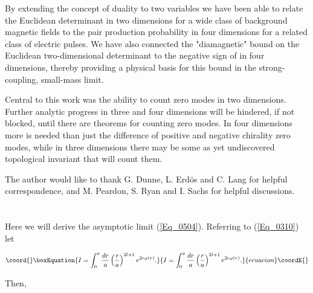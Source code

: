 \documentclass[a4paper,twocolumn,showpacs,preprintnumbers,amsmath,amssymb]{revtex4}
\begin{document}
By extending the concept of duality to two variables we have been able
to relate the Euclidean determinant in two dimensions for a wide class
of background magnetic fields to the pair production probability in
four dimensions for a related class of electric pulses. We have also
connected the "diamagnetic" bound on the Euclidean two-dimensional
determinant to the negative sign of
\coordHE{} in four dimensions, thereby
providing a physical basis for this bound in the strong-coupling,
small-mass limit.

Central to this work was the ability to count zero modes in two
dimensions. Further analytic progress in three and four dimensions
will be hindered, if not blocked, until there are theorems for
counting zero modes. In four dimensions more is needed than just the
difference of positive and negative chirality zero modes, while in
three dimensions there may be some as yet undiscovered topological
invariant that will count them.


\begin{acknowledgments}
The author would like to thank G. Dunne, L. Erd\"{o}s and C. Lang for
helpful correspondence, and M. Peardon, S. Ryan and I. Sachs for
helpful discussions.
\end{acknowledgments}

\appendix*

\section{}

\setcounter{equation}{0}
\renewcommand{\theequation}{A\arabic{equation}}


Here we will derive the asymptotic limit (\ref{Eq_0504}). Referring to
(\ref{Eq_0310}) let

\begin{equation}\coord{}\boxEquation{
\label{Eq_A01}
I = \int^a_0 \frac{dr}{a}
  \left(\frac{r}{a}\right)^{2l+1} e^{2e \varphi(r)}.
}{
I = \int^a_0 \frac{dr}{a}
  \left(\frac{r}{a}\right)^{2l+1} e^{2e \varphi(r)}.
}{ecuacion}\coordE{}\end{equation}

\noindent
Then,
\end{document}
